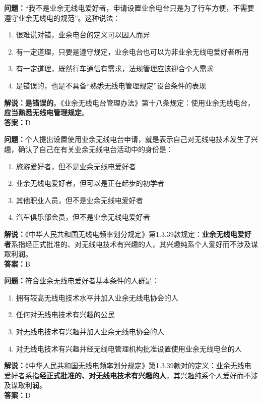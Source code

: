 \bigskip


\noindent\textbf{问题：}“我不是业余无线电爱好者，申请设置业余电台只是为了行车方便，不需要遵守业余无线电的规范”。这种说法：
\begin{enumerate}[label=\Alph*), leftmargin=3em]
	\item 很难说对错，业余电台的定义可以因人而异
	\item 有一定道理，只要是遵守规定，业余电台也可以为非业余无线电爱好者所用
	\item 有一定道理，既然行车通信有需求，法规管理应该迎合个人需求
	\item 是错误的，也是不具备“熟悉无线电管理规定”设台条件的表现
\end{enumerate}
\noindent\textbf{解说：}\textbf{是错误的}。《业余无线电台管理办法》第十八条规定：使用业余无线电台，\textbf{应当熟悉无线电管理规定}。\\\noindent\textbf{答案：}D


\bigskip


\noindent\textbf{问题：}个人提出设置使用业余无线电台申请，就是表示自己对无线电技术发生了兴趣，确认了自己在有关业余无线电台活动中的身份是：
\begin{enumerate}[label=\Alph*), leftmargin=3em]
	\item 旅游爱好者，但不是业余无线电爱好者
	\item 业余无线电爱好者，但可以是正在起步的初学者
	\item 其他职业人员，但不是业余无线电爱好者
	\item 汽车俱乐部会员，但不是业余无线电爱好者
\end{enumerate}
\noindent\textbf{解说：}《中华人民共和国无线电频率划分规定》第1.3.39款规定：\textbf{业余无线电爱好者}系指经正式批准的、对无线电技术有兴趣的人，其兴趣纯系个人爱好而不涉及谋取利润。\\\noindent\textbf{答案：}B


\bigskip


\noindent\textbf{问题：}符合业余无线电爱好者基本条件的人群是：
\begin{enumerate}[label=\Alph*), leftmargin=3em]
	\item 拥有较高无线电技术水平并加入业余无线电协会的人
	\item 任何对无线电技术有兴趣的公民
	\item 对无线电技术有兴趣并加入业余无线电协会的人
	\item 对无线电技术有兴趣并经无线电管理机构批准设置使用业余无线电台的人
\end{enumerate}
\noindent\textbf{解说：}《中华人民共和国无线电频率划分规定》第1.3.39款对的定义：业余无线电爱好者系指\textbf{经正式批准的、对无线电技术有兴趣的人}，其兴趣纯系个人爱好而不涉及谋取利润。\\\noindent\textbf{答案：}D


